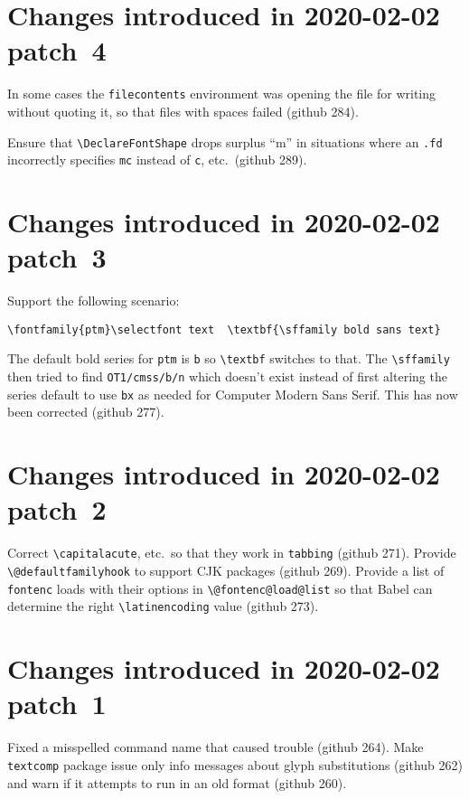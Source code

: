 \documentclass{ltxguide}
\newcommand\ghissue[1]{github #1}
\newcommand\ghissue[1]{%
    \href{https://github.com/latex3/latex2e/issues/#1}{github #1}}
\begin{document}
\section{Changes introduced in 2020-02-02 patch~4}

In some cases the \texttt{filecontents} environment was opening the
file for writing without quoting it, so that files with spaces failed
(\ghissue{284}).

Ensure that \verb=\DeclareFontShape= drops surplus ``m'' in situations
where an \texttt{.fd} incorrectly specifies \texttt{mc} instead of
\texttt{c}, etc.\ (\ghissue{289}).

\section{Changes introduced in 2020-02-02 patch~3}

Support the following scenario:
\begin{verbatim}
\fontfamily{ptm}\selectfont text  \textbf{\sffamily bold sans text}
\end{verbatim}
The default bold series for \texttt{ptm} is \texttt{b} so
\verb=\textbf= switches to that. The \verb=\sffamily= then tried to
find \texttt{OT1/cmss/b/n} which doesn't exist instead of first
altering the series default to use \texttt{bx} as needed for Computer
Modern Sans Serif. This has now been corrected (\ghissue{277}).


\section{Changes introduced in 2020-02-02 patch~2}

Correct \verb=\capitalacute=, etc.\ so that they work in
\texttt{tabbing} (\ghissue{271}).  Provide \verb=\@defaultfamilyhook= to
support CJK packages (\ghissue{269}).  Provide a list of \texttt{fontenc}
loads with their options in \verb=\@fontenc@load@list= so that Babel
can determine the right \verb=\latinencoding= value (\ghissue{273}).


\section{Changes introduced in 2020-02-02 patch~1}

Fixed a misspelled command name that caused trouble (\ghissue{264}).  Make
\texttt{textcomp} package issue only info messages about glyph
substitutions (\ghissue{262}) and warn if it attempts to run in an old format (\ghissue{260}).
\end{document}
